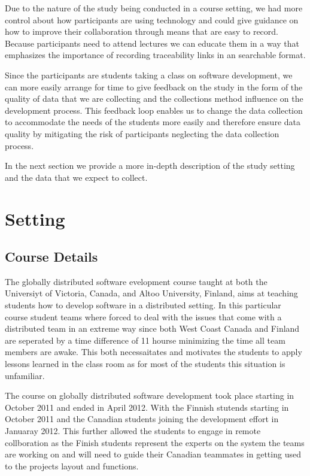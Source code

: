 Due to the nature of the study being conducted in a course setting, we had more control about how participants are using technology and could give guidance on how to improve their collaboration through means that are easy to record.
Because participants need to attend lectures we can educate them in a way that emphasizes the importance of recording traceability links in an searchable format.

Since the participants are students taking a class on software development, we can more easily arrange for time to give feedback on the study in the form of the quality of data that we are collecting and the collections method influence on the development process.
This feedback loop enables us to change the data collection to accommodate the needs of the students more easily and therefore ensure data quality by mitigating the risk of participants neglecting the data collection process. 

In the next section we provide a more in-depth description of the study setting and the data that we expect to collect.

\section{Setting}
\subsection{Course Details}
The globally distributed software evelopment course taught at both the Universiyt of Victoria, Canada, and Altoo University, Finland, aims at teaching students how to develop software in a distributed setting.
In this particular course student teams where forced to deal with the issues that come with a distributed team in an extreme way since both West Coast Canada and Finland are seperated by a time difference of 11 hourse minimizing the time all team members are awake.
This both necessaitates and motivates the students to apply lessons learned in the class room as for most of the students this situation is unfamiliar.

The course on globally distributed software development took place starting in October 2011 and ended in April 2012.
With the Finnish stutends starting in October 2011 and the Canadian students joining the development effort in Januaray 2012.
This further allowed the students to engage in remote collboration as the Finish students represent the experts on the system the teams are working on and will need to guide their Canadian teammates in getting used to the projects layout and functions.

